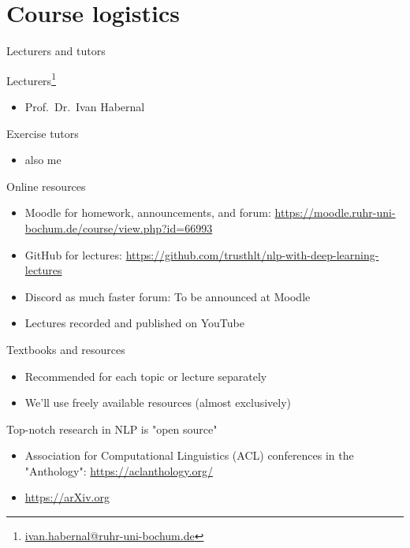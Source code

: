 \documentclass[12pt,aspectratio=169,handout]{beamer}
\begin{document}
\section{Course logistics}


\begin{frame}{Lecturers and tutors}

Lecturers\footnote{\url{ivan.habernal@ruhr-uni-bochum.de}}

\begin{itemize}
	\item Prof.\ Dr.\ Ivan Habernal
\end{itemize}

Exercise tutors

\begin{itemize}
	\item also me
\end{itemize}

\end{frame}



\begin{frame}{Online resources}
	
\begin{itemize}
	\item Moodle for homework, announcements, and forum: \url{https://moodle.ruhr-uni-bochum.de/course/view.php?id=66993}
	\item GitHub for lectures: \url{https://github.com/trusthlt/nlp-with-deep-learning-lectures}
	\item Discord as much faster forum: To be announced at Moodle
	\item Lectures recorded and published on YouTube
\end{itemize}
	
\end{frame}

\begin{frame}{Textbooks and resources}
	
\begin{itemize}
	\item Recommended for each topic or lecture separately
	\item We'll use freely available resources (almost exclusively)
\end{itemize}

Top-notch research in NLP is "open source"

\begin{itemize}
	\item Association for Computational Linguistics (ACL) conferences in the "Anthology": \url{https://aclanthology.org/}
	\item \url{https://arXiv.org}
\end{itemize}
	
\end{frame}
\end{document}
